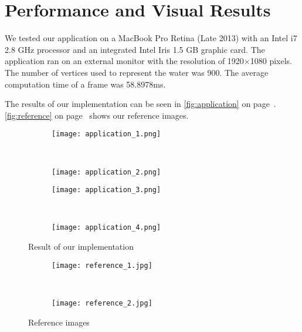 \section{Performance and Visual Results}\label{sec:performance_visual_results}


We tested our application on a MacBook Pro Retina (Late 2013) with an Intel i7
2.8 GHz processor and an integrated Intel Iris 1.5 GB graphic card. The
application ran on an external monitor with the resolution of 1920$\times$1080
pixels. The number of vertices used to represent the water was 900. The average
computation time of a frame was 58.8978ms.

The results of our implementation can be seen in \autoref{fig:application} on
page~\pageref{fig:application}.  \autoref{fig:reference} on
page~\pageref{fig:reference} shows our reference images.

\begin{figure}[htb]
    \centering
    \begin{subfigure}[t]{\textwidth}
        \centering
        \texttt{[image: application\_1.png]}\label{fig:application_1}
    \end{subfigure}\\
    \begin{subfigure}[t]{\textwidth}
        \centering
        \texttt{[image: application\_2.png]}\label{fig:application_2}
    \end{subfigure}
\end{figure}
\begin{figure}[htb]\ContinuedFloat{}
    \centering
    \begin{subfigure}[t]{\textwidth}
        \centering
        \texttt{[image: application\_3.png]}\label{fig:application_3}
    \end{subfigure}\\
    \begin{subfigure}[t]{\textwidth}
        \centering
        \texttt{[image: application\_4.png]}\label{fig:application_4}
    \end{subfigure}
    \caption{Result of our implementation}\label{fig:application}
\end{figure}


\begin{figure}[ht!]
    \centering
    \begin{subfigure}[ht!]{\textwidth}
        \centering
        \texttt{[image: reference\_1.jpg]}\label{fig:reference_1}
    \end{subfigure}\\
    \begin{subfigure}[ht!]{\textwidth}
        \centering
        \texttt{[image: reference\_2.jpg]}\label{fig:reference_2}
    \end{subfigure}
    \caption{Reference images}\label{fig:reference}
\end{figure}
